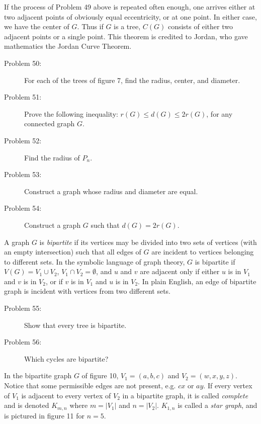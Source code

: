 \documentclass{article}
\begin{document}
If the process of Problem 49 above is repeated often enough, one arrives either at two adjacent points of obviously equal eccentricity, or at one point. In either case, we have the center of $G$. Thus if $G$ is a tree, $C(G)$ consists of either two adjacent points or a single point. This theorem is credited to Jordan, who gave mathematics the Jordan Curve Theorem.

\begin{description}

\item[Problem 50:] For each of the trees of figure 7, find the radius, center, and diameter.

\item[Problem 51:] Prove the following inequality: $r(G) \leq d(G) \leq 2r(G)$, for any connected graph $G$.

\item[Problem 52:] Find the radius of $P_n$.

\item[Problem 53:] Construct a graph whose radius and diameter are equal.

\item[Problem 54:] Construct a graph $G$ such that $d(G)=2r(G)$.

\end{description}

A graph $G$ is \emph{bipartite} if its vertices may be divided into two sets of vertices (with an empty intersection) such that all edges of $G$ are incident to vertices belonging to different sets. In the symbolic language of graph theory, $G$ is bipartite if $V(G) = V_1 \cup V_2$, $V_1 \cap V_2 = \emptyset$, and $u$ and $v$ are adjacent only if either $u$ is in $V_1$ and $v$ is in $V_2$, or if $v$ is in $V_1$ and $u$ is in $V_2$. In plain English, an edge of bipartite graph is incident with vertices from two different sets.

\begin{description}

\item[Problem 55:] Show that every tree is bipartite.

\item[Problem 56:] Which cycles are bipartite? 

\end{description}

In the bipartite graph $G$ of figure 10, $V_1=(a,b,c)$ and $V_2=(w,x,y,z)$. Notice that some permissible edges are not present, e.g. $cx$ or $ay$. If every vertex of $V_1$ is adjacent to every vertex of $V_2$ in a bipartite graph, it is called \emph{complete} and is denoted $K_{m,n}$ where $m=|V_1|$ and $n=|V_2|$. $K_{1,n}$ is called a \emph{star graph}, and is pictured in figure 11 for $n=5$.
\end{document}
